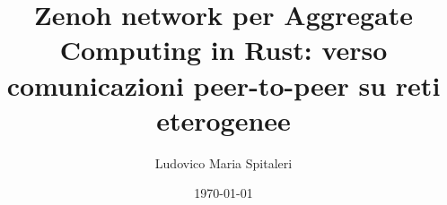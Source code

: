 \documentclass[12pt,a4paper,openright,twoside]{book}
\title{Zenoh network per Aggregate Computing in Rust: verso comunicazioni peer-to-peer su reti eterogenee}
\author{Ludovico Maria Spitaleri}
\date{\today}
\begin{document}
\frontmatter\frontispiece




\acresetall

\tableofcontents
\listoffigures
\lstlistoflistings

\mainmatter










\backmatter






\end{document}
